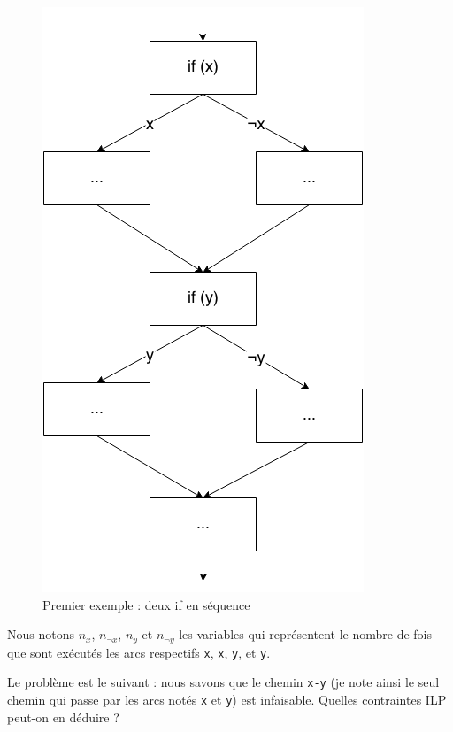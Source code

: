 \documentclass[french]{article}
\begin{document}
  \begin{figure}
    \centering
    \includegraphics[scale=0.4]{./pictures/if_2seq.png}
    \caption{Premier exemple : deux if en séquence}
    \label{if_2seq}
  \end{figure}

  Nous notons $n_x$, $n_{\neg x}$, $n_y$ et $n_{\neg y}$ les variables qui représentent le nombre de fois que sont exécutés les arcs respectifs \texttt{x}, \texttt{\textlnot x}, \texttt{y}, et \texttt{\textlnot y}.

  Le problème est le suivant : nous savons que le chemin \texttt{x-y} (je note ainsi le seul chemin qui passe par les arcs notés \texttt{x} et \texttt{y}) est infaisable. Quelles contraintes ILP peut-on en déduire ?
\end{document}
